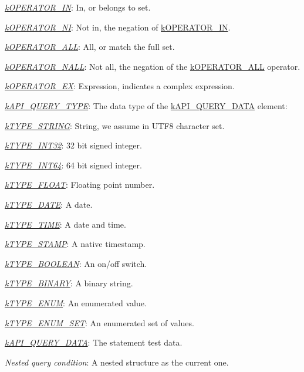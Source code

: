 \begin{DoxyItemize}
\begin{DoxyItemize}
\begin{DoxyItemize}
\begin{DoxyItemize}
\item {\itshape \hyperlink{}{k\-O\-P\-E\-R\-A\-T\-O\-R\-\_\-\-I\-N}}\-: In, or belongs to set. 
\item {\itshape \hyperlink{}{k\-O\-P\-E\-R\-A\-T\-O\-R\-\_\-\-N\-I}}\-: Not in, the negation of \hyperlink{}{k\-O\-P\-E\-R\-A\-T\-O\-R\-\_\-\-I\-N}. 
\item {\itshape \hyperlink{}{k\-O\-P\-E\-R\-A\-T\-O\-R\-\_\-\-A\-L\-L}}\-: All, or match the full set. 
\item {\itshape \hyperlink{}{k\-O\-P\-E\-R\-A\-T\-O\-R\-\_\-\-N\-A\-L\-L}}\-: Not all, the negation of the \hyperlink{}{k\-O\-P\-E\-R\-A\-T\-O\-R\-\_\-\-A\-L\-L} operator. 
\item {\itshape \hyperlink{}{k\-O\-P\-E\-R\-A\-T\-O\-R\-\_\-\-E\-X}}\-: Expression, indicates a complex expression. 
\end{DoxyItemize}
\item {\itshape \hyperlink{}{k\-A\-P\-I\-\_\-\-Q\-U\-E\-R\-Y\-\_\-\-T\-Y\-P\-E}}\-: The data type of the \hyperlink{}{k\-A\-P\-I\-\_\-\-Q\-U\-E\-R\-Y\-\_\-\-D\-A\-T\-A} element\-: 
\begin{DoxyItemize}
\item {\itshape \hyperlink{}{k\-T\-Y\-P\-E\-\_\-\-S\-T\-R\-I\-N\-G}}\-: String, we assume in U\-T\-F8 character set. 
\item {\itshape \hyperlink{}{k\-T\-Y\-P\-E\-\_\-\-I\-N\-T32}}\-: 32 bit signed integer. 
\item {\itshape \hyperlink{}{k\-T\-Y\-P\-E\-\_\-\-I\-N\-T64}}\-: 64 bit signed integer. 
\item {\itshape \hyperlink{}{k\-T\-Y\-P\-E\-\_\-\-F\-L\-O\-A\-T}}\-: Floating point number. 
\item {\itshape \hyperlink{}{k\-T\-Y\-P\-E\-\_\-\-D\-A\-T\-E}}\-: A date. 
\item {\itshape \hyperlink{}{k\-T\-Y\-P\-E\-\_\-\-T\-I\-M\-E}}\-: A date and time. 
\item {\itshape \hyperlink{}{k\-T\-Y\-P\-E\-\_\-\-S\-T\-A\-M\-P}}\-: A native timestamp. 
\item {\itshape \hyperlink{}{k\-T\-Y\-P\-E\-\_\-\-B\-O\-O\-L\-E\-A\-N}}\-: An on/off switch. 
\item {\itshape \hyperlink{}{k\-T\-Y\-P\-E\-\_\-\-B\-I\-N\-A\-R\-Y}}\-: A binary string. 
\item {\itshape \hyperlink{}{k\-T\-Y\-P\-E\-\_\-\-E\-N\-U\-M}}\-: An enumerated value. 
\item {\itshape \hyperlink{}{k\-T\-Y\-P\-E\-\_\-\-E\-N\-U\-M\-\_\-\-S\-E\-T}}\-: An enumerated set of values. 
\end{DoxyItemize}
\item {\itshape \hyperlink{}{k\-A\-P\-I\-\_\-\-Q\-U\-E\-R\-Y\-\_\-\-D\-A\-T\-A}}\-: The statement test data. 
\end{DoxyItemize}
\item {\itshape Nested query condition}\-: A nested structure as the current one. 
\end{DoxyItemize}
\end{DoxyItemize}


